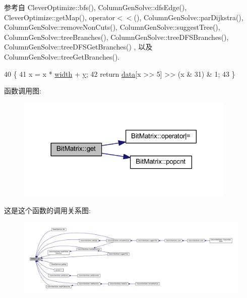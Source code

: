 参考自 Clever\+Optimize\+::bfs(), Column\+Gen\+Solve\+::dfs\+Edge(), Clever\+Optimize\+::get\+Map(), operator$<$$<$(), Column\+Gen\+Solve\+::par\+Dijkstra(), Column\+Gen\+Solve\+::remove\+Non\+Cuts(), Column\+Gen\+Solve\+::suggest\+Tree(), Column\+Gen\+Solve\+::tree\+Branches(), Column\+Gen\+Solve\+::tree\+D\+F\+S\+Branches(), Column\+Gen\+Solve\+::tree\+D\+F\+S\+Get\+Branches() , 以及 Column\+Gen\+Solve\+::tree\+Get\+Branches().


\begin{DoxyCode}
40     \{
41         x = x * \hyperlink{classBitMatrix_ac271de23ac5446a0a75ee457a385d882}{width} + \hyperlink{classes_8txt_a52673b1e0cce0104e52dcd12727f211e}{y};
42         \textcolor{keywordflow}{return} \hyperlink{classBitMatrix_a8a914444d9945c79a7e3cc88a49ef928}{data}[x >> 5] >> (x & 31) & 1;
43     \}
\end{DoxyCode}


函数调用图\+:
\nopagebreak
\begin{figure}[H]
\begin{center}
\leavevmode
\includegraphics[width=296pt]{classBitMatrix_ad19d1045b54ccc8a99d70d38305b4ca6_cgraph}
\end{center}
\end{figure}




这是这个函数的调用关系图\+:
\nopagebreak
\begin{figure}[H]
\begin{center}
\leavevmode
\includegraphics[width=350pt]{classBitMatrix_ad19d1045b54ccc8a99d70d38305b4ca6_icgraph}
\end{center}
\end{figure}


